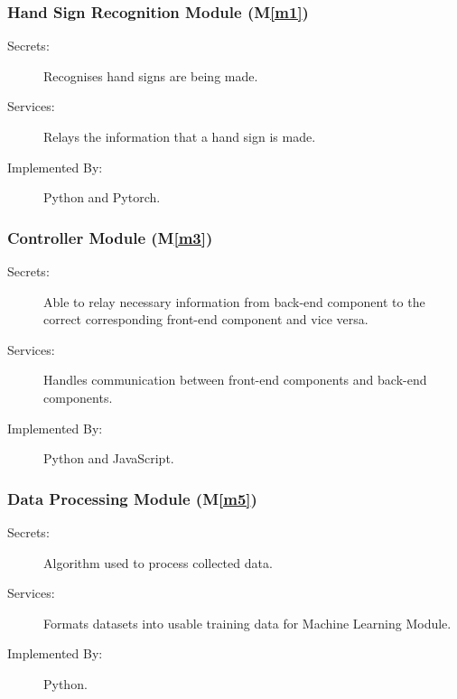 \documentclass[12pt, titlepage]{article}
\newcommand{\mref}[1]{M\ref{#1}}
\begin{document}
\subsubsection{Hand Sign Recognition Module (\mref{m1})}
\begin{description}
\item[Secrets:] Recognises hand signs are being made.
\item[Services:] Relays the information that a hand sign is made.
\item[Implemented By:] Python and Pytorch.
\end{description}

\subsubsection{Controller Module (\mref{m3})}
\begin{description}
\item[Secrets:] Able to relay necessary information from back-end component to the correct corresponding front-end component and vice versa.
\item[Services:] Handles communication between front-end components and back-end components.
\item[Implemented By:] Python and JavaScript.
\end{description}

\subsubsection{Data Processing Module (\mref{m5})}
\begin{description}
\item[Secrets:] Algorithm used to process collected data.
\item[Services:] Formats datasets into usable training data for Machine Learning Module.
\item[Implemented By:] Python.
\end{description}
\end{document}
